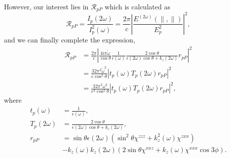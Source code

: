 However, our interest lies in $\mathcal{R}_{pP}$ which is calculated as
\begin{equation*}
\mathcal{R}_{pP}
  = \frac{I_{p}{(2\omega)}}{I_{p}^{2}(\omega)}
  = \frac{2\pi}{c}
  \left\vert
  \frac{E^{(2\omega)}(\parallel,\parallel)}{E^{2}_{p}}
  \right\vert^{2},
\end{equation*}
and we can finally complete the expression,
\begin{align}
\mathcal{R}_{pP}
&= \frac{2\pi}{c}
   \left\vert
   \frac{4i\pi\tilde{\omega}}{\cos\theta}
   \frac{1}{\epsilon(\omega)}
   \frac{2\cos\theta}{\epsilon(2\omega)\cos\theta + k_{z}(2\omega)}r_{pP}
   \right\vert^{2}\nonumber\\
&= \frac{32\pi^{3}\tilde{\omega}^{2}}{c\cos^{2}\theta}
   \left\vert t_{p}(\omega)T_{p}(2\omega)r_{pP}\right\vert^{2}\nonumber\\
&= \frac{32\pi^{3}\omega^{2}}{c^{3}\cos^{2}\theta}
   \left\vert t_{p}(\omega)T_{p}(2\omega)r_{pP}\right\vert^{2},\label{RpP}
\end{align}
where
\begin{equation*}
\begin{split}
t_{p}(\omega)
&= \frac{1}{\epsilon(\omega)},\\
T_{p}(2\omega)
&= \frac{2\cos\theta}{\epsilon(2\omega)\cos\theta + k_{z}(2\omega)},\\
r_{pP} &= \sin\theta\epsilon(2\omega)
(\sin^{2}\theta\chi^{zzz} + k^{2}_{z}(\omega)\chi^{zxx})\\
&- k_{z}(\omega)k_{z}(2\omega)
(2\sin\theta\chi^{xxz} + k_{z}(\omega)\chi^{xxx}\cos3\phi).
\end{split}
\end{equation*}


